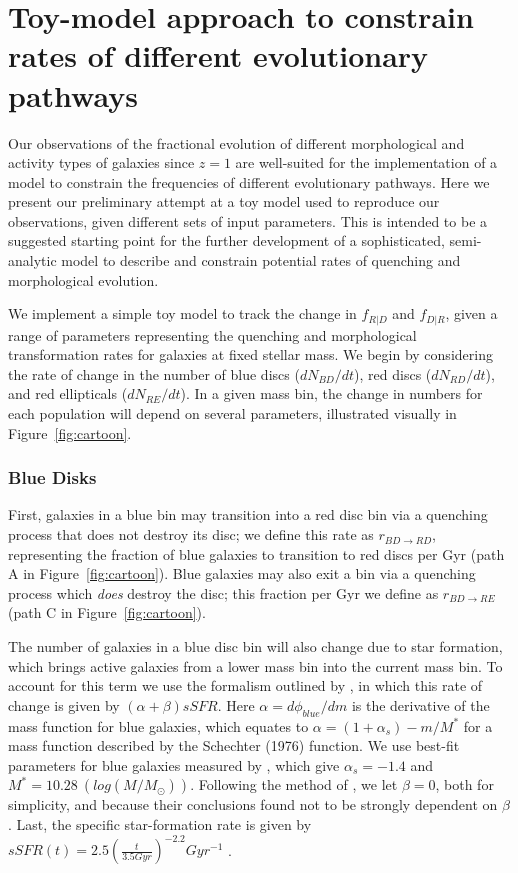 \documentclass[useAMS,usenatbib]{mn2e}
\begin{document}

  


\newpage
\clearpage

\appendix

\section{Toy-model approach to constrain rates of different evolutionary pathways}

Our observations of the fractional evolution of different morphological and activity types of galaxies since $z=1$ are well-suited for the implementation of a model to constrain the frequencies of different evolutionary pathways. Here we present our preliminary attempt at a toy model used to reproduce our observations, given different sets of input parameters. This is intended to be a suggested starting point for the further development of a sophisticated, semi-analytic model to describe and constrain potential rates of quenching and morphological evolution. 

We implement a simple toy model to track the change in $f_{R|D}$ and $f_{D|R}$, given a range of parameters representing the quenching and morphological transformation rates for galaxies at fixed stellar mass. We begin by considering the rate of change in the number of blue discs ($dN_{BD}/dt$), red discs ($dN_{RD}/dt$), and red ellipticals ($dN_{RE}/dt$). In a given mass bin, the change in numbers for each population will depend on several parameters, illustrated visually in Figure~\ref{fig:cartoon}.

\subsubsection{Blue Disks}
First, galaxies in a blue bin may transition into a red disc bin via a quenching process that does not destroy its disc; we define this rate as $r_{BD \rightarrow RD}$, representing the fraction of blue galaxies to transition to red discs per Gyr (path A in Figure~\ref{fig:cartoon}). Blue galaxies may also exit a bin via a quenching process which \emph{does} destroy the disc; this fraction per Gyr we define as $r_{BD \rightarrow RE}$ (path C in Figure~\ref{fig:cartoon}).

The number of galaxies in a blue disc bin will also change due to star formation, which brings active galaxies from a lower mass bin into the current mass bin. To account for this term we use the formalism outlined by \citet{Peng2010}, in which this rate of change is given by $(\alpha + \beta)sSFR$. Here $\alpha = d\phi_{blue}/dm$ is the derivative of the mass function for blue galaxies, which equates to $\alpha = (1+\alpha_s) - m/M^*$ for a mass function described by the Schechter (1976) function. We use best-fit parameters for blue galaxies measured by \citet{Ichikawa2017}, which give $\alpha_s = -1.4$ and $M^* = 10.28 ~(log(M/M_{\odot}))$. Following the method of \citet{Peng2010}, we let $\beta=0$, both for simplicity, and because their conclusions found not to be strongly dependent on $\beta$. Last, the specific star-formation rate is given by $sSFR(t) = 2.5(\frac{t}{3.5 Gyr})^{-2.2}Gyr^{-1}$ \citep{Peng2010}.
\end{document}
